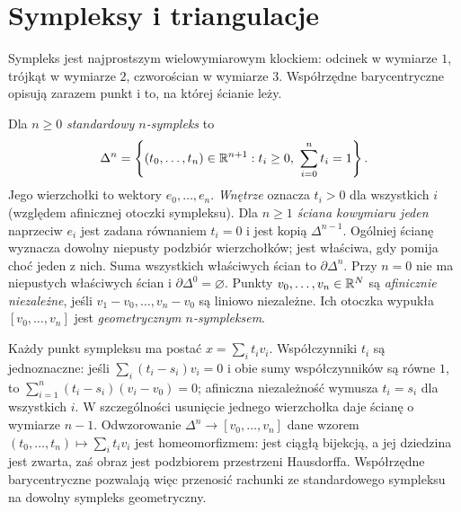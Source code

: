 \section{Sympleksy i triangulacje}
\label{sec:sympleksy}

Sympleks jest najprostszym wielowymiarowym
klockiem: odcinek w wymiarze $1$, trójkąt
w wymiarze $2$, czworościan w wymiarze $3$.
Współrzędne barycentryczne opisują
zarazem punkt i to, na której ścianie leży.

\begin{definicja}
\label{def:sympleks-standardowy}
Dla $n\geq0$ \emph{standardowy $n$-sympleks}
to
\[
 \Delta^n=
 \left\{(t_0,\ldots,t_n)\in\mathbb{R}^{n+1}:
 t_i\geq0,\ \sum_{i=0}^{n}t_i=1\right\}.
\]
Jego wierzchołki to wektory $e_0,\ldots,e_n$.
\emph{Wnętrze} oznacza $t_i>0$ dla wszystkich $i$
(względem afinicznej otoczki sympleksu).
Dla $n\geq1$ \emph{ściana kowymiaru jeden} naprzeciw $e_i$
jest zadana równaniem $t_i=0$ i jest kopią $\Delta^{n-1}$.
Ogólniej ścianę wyznacza dowolny niepusty podzbiór wierzchołków;
jest właściwa, gdy pomija choć jeden z nich.
Suma wszystkich właściwych ścian to $\partial\Delta^n$.
Przy $n=0$ nie ma niepustych właściwych ścian i $\partial\Delta^0=\varnothing$.
Punkty $v_0,\ldots,v_n\in\mathbb{R}^N$
są \emph{afinicznie niezależne}, jeśli
$v_1-v_0,\ldots,v_n-v_0$ są liniowo
niezależne. Ich otoczka wypukła
$[v_0,\ldots,v_n]$ jest
\emph{geometrycznym $n$-sympleksem}.
\end{definicja}

Każdy punkt sympleksu ma postać
$x=\sum_i t_iv_i$. Współczynniki
$t_i$ są jednoznaczne: jeśli
$\sum_i(t_i-s_i)v_i=0$ i obie sumy
współczynników są równe $1$, to
$\sum_{i=1}^n(t_i-s_i)(v_i-v_0)=0$;
afiniczna niezależność wymusza
$t_i=s_i$ dla wszystkich $i$.
W szczególności usunięcie jednego
wierzchołka daje ścianę
o wymiarze $n-1$.
Odwzorowanie $\Delta^n\to[v_0,\ldots,v_n]$ dane wzorem
$(t_0,\ldots,t_n)\mapsto\sum_i t_iv_i$ jest homeomorfizmem:
jest ciągłą bijekcją, a jej dziedzina jest zwarta,
zaś obraz jest podzbiorem przestrzeni Hausdorffa.
Współrzędne barycentryczne pozwalają więc przenosić
rachunki ze standardowego sympleksu na dowolny
sympleks geometryczny.


